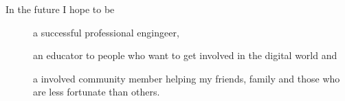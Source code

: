
\begin{cvparagraph}

In the future I hope to be
\begin{description}
  \item[] a successful professional engingeer,
  \item[] an educator to people who want to get involved in the digital world and
  \item[] a involved community member helping my friends, family and those who are less fortunate than others.
\end{description}
\end{cvparagraph}

